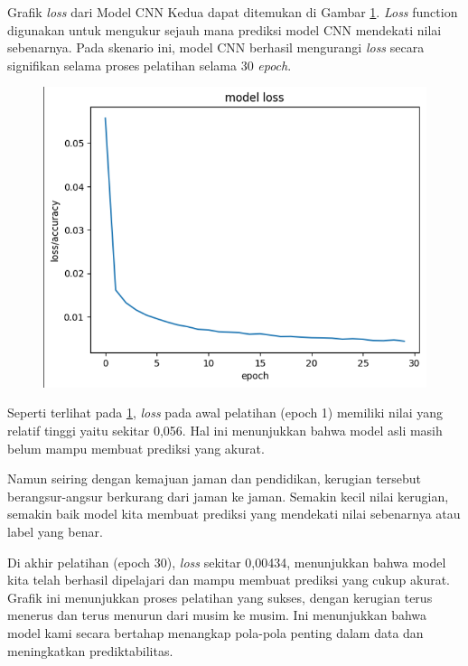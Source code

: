 Grafik \textit{loss} dari Model CNN Kedua dapat ditemukan di Gambar \ref{fig:lossModelCNNKedua}. \textit{Loss} function digunakan untuk mengukur sejauh mana prediksi model CNN mendekati nilai sebenarnya. Pada skenario ini, model CNN berhasil mengurangi \textit{loss} secara signifikan selama proses pelatihan selama 30\textit{ epoch}.

\begin{figure}[!hbt]
	\centering
	\includegraphics[width=0.7\linewidth]{gambar/bener/Loss_ModelCNN2.png}
	\label{fig:lossModelCNNKedua}
\end{figure}

Seperti terlihat pada \ref{fig:lossModelCNNKedua}, \textit{loss} pada awal pelatihan (epoch 1) memiliki nilai yang relatif tinggi yaitu sekitar 0,056. Hal ini menunjukkan bahwa model asli masih belum mampu membuat prediksi yang akurat.

Namun seiring dengan kemajuan jaman dan pendidikan, kerugian tersebut berangsur-angsur berkurang dari jaman ke jaman. Semakin kecil nilai kerugian, semakin baik model kita membuat prediksi yang mendekati nilai sebenarnya atau label yang benar.

Di akhir pelatihan (epoch 30), \textit{loss} sekitar 0,00434, menunjukkan bahwa model kita telah berhasil dipelajari dan mampu membuat prediksi yang cukup akurat. Grafik ini menunjukkan proses pelatihan yang sukses, dengan kerugian terus menerus dan terus menurun dari musim ke musim. Ini menunjukkan bahwa model kami secara bertahap menangkap pola-pola penting dalam data dan meningkatkan prediktabilitas. 

